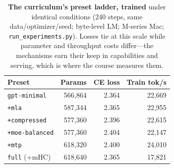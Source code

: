 \begin{table}[t]
\centering
\small
\begin{tabular}{@{}lrrr@{}}
\toprule
\textbf{Preset} & \textbf{Params} & \textbf{CE loss} & \textbf{Train tok/s} \\
\midrule
\texttt{gpt-minimal}        & 566{,}864 & 2.364 & 22{,}669 \\
\;\texttt{+mla}             & 587{,}344 & 2.365 & 22{,}955 \\
\;\texttt{+compressed}      & 577{,}360 & 2.396 & 22{,}615 \\
\;\texttt{+moe-balanced}    & 577{,}360 & 2.404 & 22{,}147 \\
\;\texttt{+mtp}             & 618{,}320 & 2.400 & 24{,}010 \\
\texttt{full} (+mHC)        & 618{,}640 & 2.365 & 17{,}821 \\
\bottomrule
\end{tabular}
\caption{\textbf{The curriculum's preset ladder, trained} under identical
conditions (240 steps, same data/optimizer/seed; byte-level LM; M-series Mac;
\texttt{run\_experiments.py}). Losses tie at this scale while parameter and
throughput costs differ---the mechanisms earn their keep in capabilities and
serving, which is where the course measures them.}
\label{tab:ladder}
\end{table}
